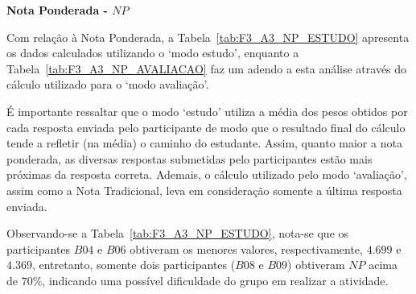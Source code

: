 \textbf{Nota Ponderada - $NP$}

Com relação à Nota Ponderada, a Tabela~\ref{tab:F3_A3_NP_ESTUDO} apresenta os dados calculados utilizando o `modo estudo', enquanto a Tabela~\ref{tab:F3_A3_NP_AVALIACAO} faz um adendo a esta análise através do cálculo utilizado para o `modo avaliação'. 

É importante ressaltar que o modo `estudo' utiliza a média dos pesos obtidos por cada resposta enviada pelo participante de modo que o resultado final do cálculo tende a refletir (na média) o caminho do estudante. Assim, quanto maior a nota ponderada, as diversas respostas submetidas pelo participantes estão mais próximas da resposta correta. Ademais, o cálculo utilizado pelo modo `avaliação', assim como a Nota Tradicional, leva em consideração somente a última resposta enviada.

Observando-se a Tabela~\ref{tab:F3_A3_NP_ESTUDO}, nota-se que os participantes $B04$ e $B06$ obtiveram os menores valores, respectivamente, $4.699$ e $4.369$, entretanto, somente dois participantes ($B08$ e $B09$) obtiveram $NP$ acima de $70\%$, indicando uma possível dificuldade do grupo em realizar a atividade.

